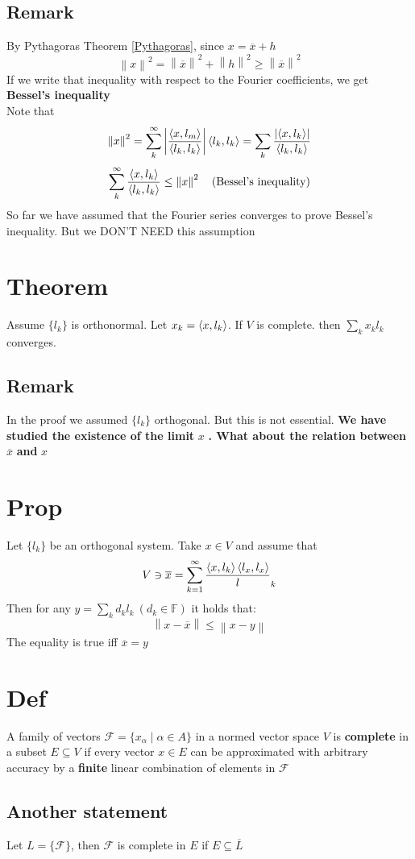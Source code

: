 \documentclass{book}
\newcommand{\abs}[1]{\left\lvert #1 \right\rvert}
\newcommand{\norm}[1]{\left\lVert #1 \right\rVert}
\begin{document}
\subsection*{Remark}
By Pythagoras Theorem \ref{Pythagoras}, since $x=\overline{x}+h$
$$\norm{x}^2=\norm{\overline{x}}^2+\norm{h}^2\geq\norm{\overline{x}}^2$$
If we write that inequality with respect to the Fourier coefficients, we get \textbf{Bessel's inequality}\\Note that
$$\norm{x}^2=\sum\limits_k^\infty\abs{\frac{\inprod{x}{l_m}}{\inprod{l_k}{l_k}}}\inprod{l_k}{l_k}=\sum\limits_k\frac{\abs{\inprod{x}{l_k}}}{\inprod{l_k}{l_k}}$$
$$\sum\limits_{k}^\infty\frac{\inprod{x}{l_k}}{\inprod{l_k}{l_k}}\leq\norm{x}^2\quad(\text{Bessel's inequality})
$$
So far we have assumed that the Fourier series converges to prove Bessel's inequality. But we DON'T NEED this assumption
\section{Theorem}
Assume $\{l_k\}$ is orthonormal. Let $x_k=\left<x,l_k\right>$. If $V$ is complete. then $\sum\limits_{k}x_kl_k$ converges.
\subsection*{Remark}In the proof we assumed $\{l_k\}$ orthogonal. But this is not essential.
\textbf{We have studied the existence of the limit} $x$ \textbf{. What about the relation between } $\overline{x}$\textbf{ and }$x$
\section{Prop}\label{Prop 67.3}
Let $\{l_k\}$ be an orthogonal system. Take $x\in V$ and assume that
$$V\ni\overline{x}=\sum\limits_{k=1}^\infty
\frac{\left<x,l_k\right>{\left<l_x,l_x\right>}}l_k$$
Then for any $y=\sum\limits_{k}d_kl_k\ (d_k\in \mathbb{F})$ it holds that:
$$\norm{x-\overline{x}}\leq\norm{x-y}$$
The equality is true iff $\overline{x}=y$
\section{Def}
A family of vectors $\mathcal{F}=\{x_\alpha\mid\alpha\in A\}$ in a normed vector space $V$ is \textbf{complete} in a subset $E\subseteq V$ if every vector $x\in E$ can be approximated with arbitrary accuracy by a \textbf{finite} linear combination of elements in $\mathcal{F}$
\subsection*{Another statement}
Let $L=\{\mathcal{F}\}$, then $\mathcal{F}$ is complete in $E$ if $E\subseteq\overline{L}$
\end{document}
